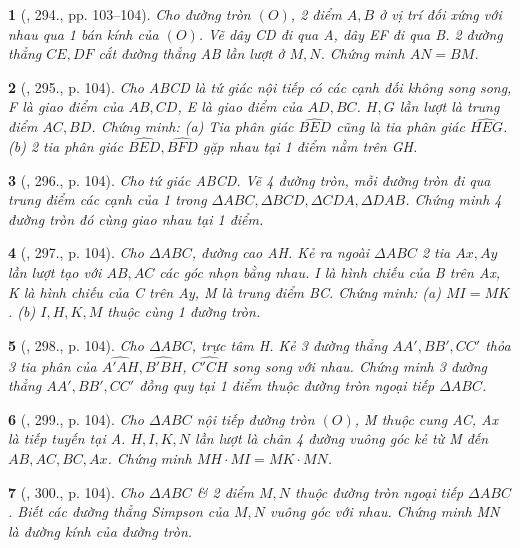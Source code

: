 \documentclass{article}
\newtheorem{baitoan}{}
\begin{document}
\begin{baitoan}[\cite{Binh_Toan_9_tap_2}, 294., pp. 103--104]
	Cho đường tròn $(O)$, 2 điểm $A,B$ ở vị trí đối xứng với nhau qua 1 bán kính của $(O)$. Vẽ dây CD đi qua A, dây EF đi qua B. 2 đường thẳng $CE,DF$ cắt đường thẳng AB lần lượt ở $M,N$. Chứng minh $AN = BM$.
\end{baitoan}

\begin{baitoan}[\cite{Binh_Toan_9_tap_2}, 295., p. 104]
	Cho ABCD là tứ giác nội tiếp có các cạnh đối không song song, F là giao điểm của $AB,CD$, E là giao điểm của $AD,BC$. $H,G$ lần lượt là trung điểm $AC,BD$. Chứng minh: (a) Tia phân giác $\widehat{BED}$ cũng là tia phân giác $\widehat{HEG}$. (b) 2 tia phân giác $\widehat{BED},\widehat{BFD}$ gặp nhau tại 1 điểm nằm trên GH.
\end{baitoan}

\begin{baitoan}[\cite{Binh_Toan_9_tap_2}, 296., p. 104]
	Cho tứ giác ABCD. Vẽ 4 đường tròn, mỗi đường tròn đi qua trung điểm các cạnh của 1 trong $\Delta ABC,\Delta BCD,\Delta CDA,\Delta DAB$. Chứng minh 4 đường tròn đó cùng giao nhau tại 1 điểm.
\end{baitoan}

\begin{baitoan}[\cite{Binh_Toan_9_tap_2}, 297., p. 104]
	Cho $\Delta ABC$, đường cao AH. Kẻ ra ngoài $\Delta ABC$ 2 tia $Ax,Ay$ lần lượt tạo với $AB,AC$ các góc nhọn bằng nhau. I là hình chiếu của B trên Ax, K là hình chiếu của C trên Ay, M là trung điểm BC. Chứng minh: (a) $MI = MK$. (b) $I,H,K,M$ thuộc cùng 1 đường tròn.
\end{baitoan}

\begin{baitoan}[\cite{Binh_Toan_9_tap_2}, 298., p. 104]
	Cho $\Delta ABC$, trực tâm H. Kẻ 3 đường thẳng $AA',BB',CC'$ thỏa 3 tia phân của $\widehat{A'AH},\widehat{B'BH}$, $\widehat{C'CH}$ song song với nhau. Chứng minh 3 đường thẳng $AA',BB',CC'$ đồng quy tại 1 điểm thuộc đường tròn ngoại tiếp $\Delta ABC$.
\end{baitoan}

\begin{baitoan}[\cite{Binh_Toan_9_tap_2}, 299., p. 104]
	Cho $\Delta ABC$ nội tiếp đường tròn $(O)$, M thuộc cung AC, Ax là tiếp tuyến tại A. $H,I,K,N$ lần lượt là chân 4 đường vuông góc kẻ từ M đến $AB,AC,BC,Ax$. Chứng minh $MH\cdot MI = MK\cdot MN$.
\end{baitoan}

\begin{baitoan}[\cite{Binh_Toan_9_tap_2}, 300., p. 104]
	Cho $\Delta ABC$ \& 2 điểm $M,N$ thuộc đường tròn ngoại tiếp $\Delta ABC$. Biết các đường thẳng Simpson của $M,N$ vuông góc với nhau. Chứng minh MN là đường kính của đường tròn.
\end{baitoan}
\end{document}
